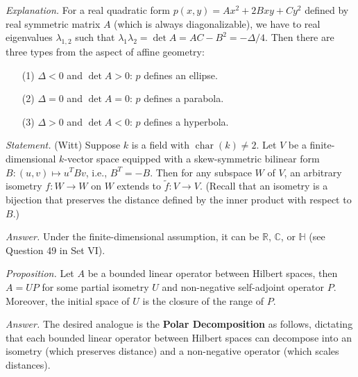 \documentclass{mathproblems}
\newcommand\R{\mathbb{R}}
\newcommand\C{\mathbb{C}}
\begin{document}
\begin{questions}
\textit{Explanation.} For a real quadratic form $p(x,y)=Ax^2+2Bxy+Cy^2$ defined by real symmetric matrix $A$ (which is always diagonalizable), we have to real eigenvalues $\lambda_{1,2}$ such that $\lambda_1\lambda_2=\det A=AC-B^2=-\Delta/4$. Then there are three types from the aspect of affine geometry: \vspace{-6pt}
\begin{itemize}
\item[(1)] $\Delta<0$ and $\det A>0$: $p$ defines an ellipse. \vspace{-4pt}

\item[(2)] $\Delta=0$ and $\det A=0$: $p$ defines a parabola. \vspace{-4pt}

\item[(3)] $\Delta>0$ and $\det A<0$: $p$ defines a hyperbola.
\end{itemize}



\textit{Statement.} (Witt) Suppose $k$ is a field with $\operatorname{char}(k)\neq 2$. Let $V$ be a finite-dimensional $k$-vector space equipped with a skew-symmetric bilinear form $B:(u,v)\mapsto u^T B v$, i.e., $B^T=-B$. Then for any subspace $W$ of $V$, an arbitrary isometry $f:W\to W$ on $W$ extends to $\tilde f:V\to V$. (Recall that an isometry is a bijection that preserves the distance defined by the inner product with respect to $B$.)


\textit{Answer.} Under the finite-dimensional assumption, it can be $\R$, $\C$, or $\mathbb{H}$ (see Question 49 in Set VI).


{\color{violet}\textit{Proposition.} Let $A$ be a bounded linear operator between Hilbert spaces, then $A=UP$ for some partial isometry $U$ and non-negative self-adjoint operator $P$. Moreover, the initial space of $U$ is the closure of the range of $P$.}

\textit{Answer.} The desired analogue is the {\color{violet}\textbf{Polar Decomposition}} as follows, dictating that each bounded linear operator between Hilbert spaces can decompose into an isometry (which preserves distance) and a non-negative operator (which scales distances).


\end{questions}
\end{document}
